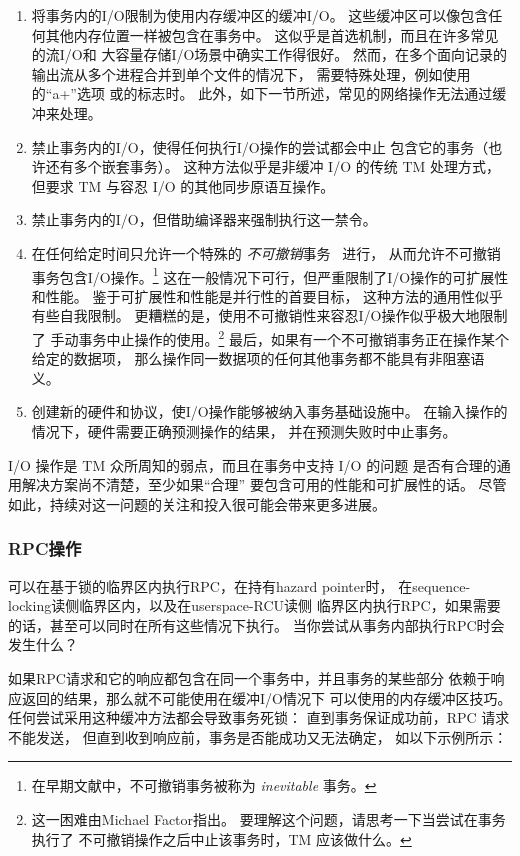 \begin{enumerate}
\item	将事务内的I/O限制为使用内存缓冲区的缓冲I/O。
	这些缓冲区可以像包含任何其他内存位置一样被包含在事务中。
	这似乎是首选机制，而且在许多常见的流I/O和
	大容量存储I/O场景中确实工作得很好。
	然而，在多个面向记录的输出流从多个进程合并到单个文件的情况下，
	需要特殊处理，例如使用的``a+''选项
	或的标志时。
	此外，如下一节所述，常见的网络操作无法通过缓冲来处理。
\item	禁止事务内的I/O，使得任何执行I/O操作的尝试都会中止
	包含它的事务（也许还有多个嵌套事务）。
	这种方法似乎是非缓冲 I/O 的传统 TM 处理方式，
	但要求 TM 与容忍 I/O 的其他同步原语互操作。
\item	禁止事务内的I/O，但借助编译器来强制执行这一禁令。
\item	在任何给定时间只允许一个特殊的
	\emph{不可撤销}事务~\cite{SpearMichaelScott2008InevitableSTM}
	进行，
	从而允许不可撤销事务包含I/O操作。\footnote{
		在早期文献中，不可撤销事务被称为
		\emph{inevitable} 事务。}
	这在一般情况下可行，但严重限制了I/O操作的可扩展性和性能。
	鉴于可扩展性和性能是并行性的首要目标，
	这种方法的通用性似乎有些自我限制。
	更糟糕的是，使用不可撤销性来容忍I/O操作似乎极大地限制了
	手动事务中止操作的使用。\footnote{
		这一困难由Michael Factor指出。
		要理解这个问题，请思考一下当尝试在事务执行了
		不可撤销操作之后中止该事务时，TM 应该做什么。}
	最后，如果有一个不可撤销事务正在操作某个给定的数据项，
	那么操作同一数据项的任何其他事务都不能具有非阻塞语义。
\item	创建新的硬件和协议，使I/O操作能够被纳入事务基础设施中。
	在输入操作的情况下，硬件需要正确预测操作的结果，
	并在预测失败时中止事务。
\end{enumerate}

I/O 操作是 TM 众所周知的弱点，而且在事务中支持 I/O 的问题
是否有合理的通用解决方案尚不清楚，至少如果``合理''
要包含可用的性能和可扩展性的话。
尽管如此，持续对这一问题的关注和投入很可能会带来更多进展。

\subsubsection{RPC操作}
\label{sec:future:RPC Operations}

可以在基于锁的临界区内执行RPC，在持有hazard pointer时，
在sequence-locking读侧临界区内，以及在userspace-RCU读侧
临界区内执行RPC，如果需要的话，甚至可以同时在所有这些情况下执行。
当你尝试从事务内部执行RPC时会发生什么？

如果RPC请求和它的响应都包含在同一个事务中，并且事务的某些部分
依赖于响应返回的结果，那么就不可能使用在缓冲I/O情况下
可以使用的内存缓冲区技巧。
任何尝试采用这种缓冲方法都会导致事务死锁：
直到事务保证成功前，RPC 请求不能发送，
但直到收到响应前，事务是否能成功又无法确定，
如以下示例所示：

